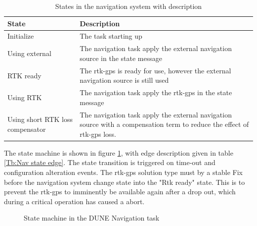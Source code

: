 \begin{table}[H]
\begin{tabular}{ | p{3cm} | p{8cm} |}
	\hline 
	\textbf{State}						& \textbf{Description} \\ \hline
	Initialize							& The task starting up\\ \hline
	Using external						& The navigation task apply the external navigation source in the state message\\ \hline
	RTK ready							& The \gls{rtk-gps} is ready for use, however the external navigation source is still used\\ \hline
	Using RTK							& The navigation task apply the \gls{rtk-gps} in the state message\\ \hline
	Using short RTK loss compensator	& The navigation task apply the external navigation source with a compensation term to reduce the effect of \gls{rtk-gps} loss. \\ \hline
\end{tabular}
\caption{States in the navigation system with description}
\label{Tb:StateDescription}
\end{table}
The state machine is shown in figure \ref{Fig:NavState}, with edge description given in table \ref{Tb:Nav state edge}. The state transition is triggered on time-out and configuration alteration events. The \gls{rtk-gps} solution type must by a stable Fix before the navigation system change state into the "Rtk ready" state. This is to prevent the \gls{rtk-gps} to imminently be available again after a drop out, which during a critical operation has caused a abort.
\newpage
\begin{figure}[H]
\def\svgwidth{\textwidth} %

\caption{State machine in the DUNE Navigation task}
\label{Fig:NavState}
\end{figure}
